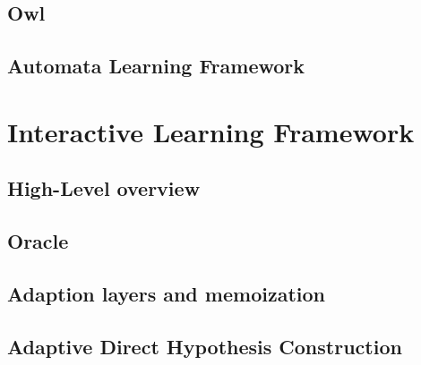 \subsection{Owl} \label{subsec_owl}

\subsection{Automata Learning Framework} \label{subsec_automatonlearning}

\section{Interactive Learning Framework} \label{sec_interactivelearningframework}

\subsection{High-Level overview} \label{subsec_highleveloverview}

\subsection{Oracle} \label{subsec_oracleimpl}

\subsection{Adaption layers and memoization} \label{subsec_memoization}

\subsection{Adaptive Direct Hypothesis Construction} \label{subsec_adaptivedhc}


